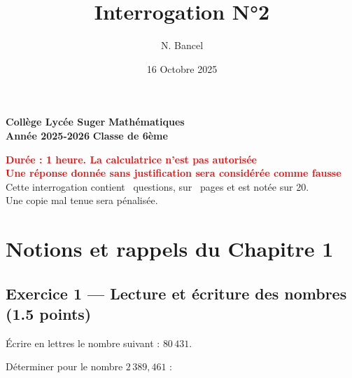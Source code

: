 \documentclass{exam}
\title{Interrogation N°2}
\author{N. Bancel}
\date{16 Octobre 2025}
\begin{document}
\textbf{Collège Lycée Suger}
\hfill
\textbf{Mathématiques} \\

\textbf{Année 2025-2026}
\hfill
\textbf{Classe de 6ème} \par

{\let\newpage\relax\maketitle}

\begin{center}
\textbf{\textcolor{red}{Durée : 1 heure. La calculatrice n'est pas autorisée}} \\
\textbf{\textcolor{red}{Une réponse donnée sans justification sera considérée comme fausse}} \\
Cette interrogation contient \numquestions\ questions, sur \numpages\ pages et est notée sur 20. \\
Une copie mal tenue sera pénalisée.

\end{center}

\section*{Notions et rappels du Chapitre 1}

\subsection*{Exercice 1 — Lecture et écriture des nombres (1.5 points)}

\begin{questions}
  \question[0.5] Écrire en lettres le nombre suivant : \quad $80\,431$.
  
\question[1] Déterminer pour le nombre $2\,389,461$ :
\end{questions}
\end{document}
